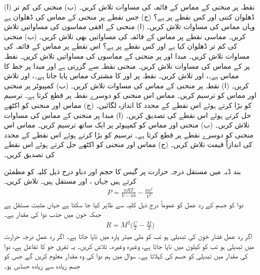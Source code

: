 (ا) نقطہ  پر منحنی  کے مماس کے قائمہ کی مساوات تلاش کریں۔ (ب)   منحنی کی کم تر ڈھلوان  کتنی اور کس نقطے پر ہے؟ (ج) جس نقطے پر منحنی کے مماس کی ڈھلوان  ہے وہاں مماس کی مساوات تلاش کریں۔
(ا) منحنی  کے افقی مماسوں کی مساواتیں تلاش کریں۔ مماسی نقطے پر مماس کے قائمہ کی مساواتیں بھی تلاش کریں۔ (ب) منحنی کی کم تر ڈھلوان کیا ہے اور کس نقطے پر ہے؟ اس نقطے پر مماس کے قائمہ کی مساوات تلاش کریں۔
مبدا اور  پر منحنی  کے مماسوں کی مساواتیں تلاش کریں۔ 
نقطہ  پر  کے مماس کی مساوات تلاش کریں۔
منحنی  نقطہ  سے گزرتی ہے اور مبدا پر خط  کا مماس ہے۔،  اور  تلاش کریں۔
نقطہ  پر  اور  کا مشترک مماس پایا جاتا ہے۔،  اور  تلاش کریں۔
(ا)  نقطہ  پر منحنی  کے مماس کی مساوات تلاش کریں۔ (ب) کمپیوٹر پر منحنی اور مماس کو ترسیم کریں۔  مماس اس منحنی کو دوسرے نقطہ پر قطع کرتا ہے۔ ترسیم کو بڑا کرتے ہوئے اس نقطے کے  محدد کا اندازہ لگائیں۔ (ج) مماس اور منحنی کو اکٹھے حل کرتے ہوئے اس نقطے کی تصدیق کریں۔
(ا) مبدا پر منحنی  کے مماس کی مساوات تلاش کریں۔ (ب) منحنی اور مماس کو کمپیوٹر پر ایک ساتھ ترسیم کریں۔ مماس اس منحنی کو دوسرے نقطے پر  قطع کرتا ہے۔ ترسیم کو بڑا کرتے ہوئے اس نقطے کے محدد کی اندازاً قیمت تلاش کریں۔ (ج) مماس اور منحنی کو اکٹھے حل کرتے ہوئے  اس نقطے کی تصدیق کریں۔

\quad
بند ڈبہ میں مستقل درجہ حرارت  پر گیس کا حجم  اور دباو  درج ذیل کلیہ کو مطمئن کرتے ہیں جہاں ،  اور  مستقل ہیں۔  تلاش کریں۔
\begin{align*}
P=\frac{nRT}{V-nb}-\frac{an^2}{V^2}
\end{align*}
\quad
دوا کو جسم کے رد عمل  کو عموماً درج ذیل کلیہ  سے ظاہر کیا جا سکتا ہے جہاں  مثبت مستقل ہے جبکہ  خون میں جذب دوا کی مقدار ہے۔
\begin{align*}
R=M^2\big(\frac{C}{2}-\frac{M}{3}\big)
\end{align*}
اگر رد عمل فشار خون کی تبدیلی ہو تب  کو ملی میٹر پارہ میں ناپا جاتا ہے۔ اگر رد عمل درجہ حرارت میں تبدیلی ہو تب  کو کیلون میں ناپا جاتا ہے، وغیرہ وغیرہ۔  تلاش کریں۔ یہ تفرق جو  کا تفاعل ہے،  دوا کی  مقدار میں تبدیلی کو جسم کی   کہلاتا ہے۔ سوال  میں ہم دوا کی وہ مقدار معلوم کریں گے جس کو جسم  زیادہ سے زیادہ حساس ہو۔


